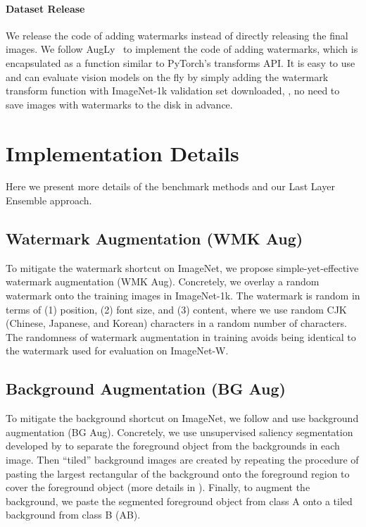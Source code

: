\documentclass[10pt,twocolumn,letterpaper]{article}
\begin{document}
\paragraph{Dataset Release} We release the code of adding watermarks instead of directly releasing the final images. We follow AugLy~\cite{papakipos2022IEEECVFConf.Comput.Vis.PatternRecognit.CVPRWorkshopAugLy} to implement the code of adding watermarks, which is encapsulated as a function similar to PyTorch's transforms API. It is easy to use and can evaluate vision models on the fly by simply adding the watermark transform function with ImageNet-1k validation set downloaded, \ie, no need to save images with watermarks to the disk in advance.

\section{Implementation Details}

Here we present more details of the benchmark methods and our Last Layer Ensemble approach.

\subsection{Watermark Augmentation (WMK Aug)}
\label{appx:subsec:watermark_aug}

To mitigate the watermark shortcut on ImageNet, we propose simple-yet-effective watermark augmentation (WMK Aug). Concretely, we overlay a random watermark onto the training images in ImageNet-1k. The watermark is random in terms of (1) position, (2) font size, and (3) content, where we use random CJK (Chinese, Japanese, and Korean) characters in a random number of characters. The randomness of watermark augmentation in training avoids being identical to the watermark used for evaluation on ImageNet-W.

\subsection{Background Augmentation (BG Aug)}
\label{appx:subsec:bg_aug}

To mitigate the background shortcut on ImageNet, we follow \cite{xiao2021Int.Conf.Learn.Represent.Noise,ryali2021Characterizing} and use background augmentation (BG Aug). Concretely, we use unsupervised saliency segmentation developed by \citet{ryali2021Characterizing} to separate the foreground object from the backgrounds in each image. Then ``tiled'' background images are created by repeating the procedure of pasting the largest rectangular of the background onto the foreground region to cover the foreground object (more details in \cite{xiao2021Int.Conf.Learn.Represent.Noise}). Finally, to augment the background, we paste the segmented foreground object from class A onto a tiled background from class B (AB).
\end{document}
